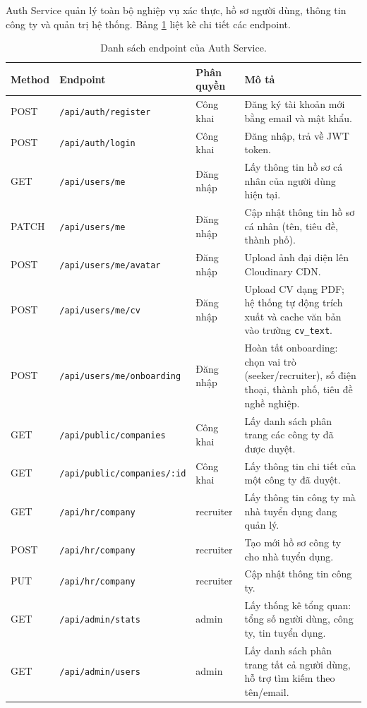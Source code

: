 \documentclass[../DoAn.tex]{subfiles}
\begin{document}
Auth Service quản lý toàn bộ nghiệp vụ xác thực, hồ sơ người dùng, thông tin công ty và quản trị hệ thống. Bảng \ref{tab:api-auth} liệt kê chi tiết các endpoint.

\begin{table}[H]
\centering
\caption{Danh sách endpoint của Auth Service.}
\label{tab:api-auth}
\small
\begin{tabular}{|p{1.3cm}|p{5.5cm}|p{2.4cm}|p{4.5cm}|}
\hline
\textbf{Method} & \textbf{Endpoint} & \textbf{Phân quyền} & \textbf{Mô tả} \\ \hline
POST & \texttt{/api/auth/register} & Công khai & Đăng ký tài khoản mới bằng email và mật khẩu. \\ \hline
POST & \texttt{/api/auth/login} & Công khai & Đăng nhập, trả về JWT token. \\ \hline
GET  & \texttt{/api/users/me} & Đăng nhập & Lấy thông tin hồ sơ cá nhân của người dùng hiện tại. \\ \hline
PATCH & \texttt{/api/users/me} & Đăng nhập & Cập nhật thông tin hồ sơ cá nhân (tên, tiêu đề, thành phố). \\ \hline
POST & \texttt{/api/users/me/avatar} & Đăng nhập & Upload ảnh đại diện lên Cloudinary CDN. \\ \hline
POST & \texttt{/api/users/me/cv} & Đăng nhập & Upload CV dạng PDF; hệ thống tự động trích xuất và cache văn bản vào trường \texttt{cv\_text}. \\ \hline
POST & \texttt{/api/users/me/onboarding} & Đăng nhập & Hoàn tất onboarding: chọn vai trò (seeker/recruiter), số điện thoại, thành phố, tiêu đề nghề nghiệp. \\ \hline
GET  & \texttt{/api/public/companies} & Công khai & Lấy danh sách phân trang các công ty đã được duyệt. \\ \hline
GET  & \texttt{/api/public/companies/:id} & Công khai & Lấy thông tin chi tiết của một công ty đã duyệt. \\ \hline
GET  & \texttt{/api/hr/company} & recruiter & Lấy thông tin công ty mà nhà tuyển dụng đang quản lý. \\ \hline
POST & \texttt{/api/hr/company} & recruiter & Tạo mới hồ sơ công ty cho nhà tuyển dụng. \\ \hline
PUT  & \texttt{/api/hr/company} & recruiter & Cập nhật thông tin công ty. \\ \hline
GET  & \texttt{/api/admin/stats} & admin & Lấy thống kê tổng quan: tổng số người dùng, công ty, tin tuyển dụng. \\ \hline
GET  & \texttt{/api/admin/users} & admin & Lấy danh sách phân trang tất cả người dùng, hỗ trợ tìm kiếm theo tên/email. \\ \hline

\end{tabular}
\end{table}
\end{document}
